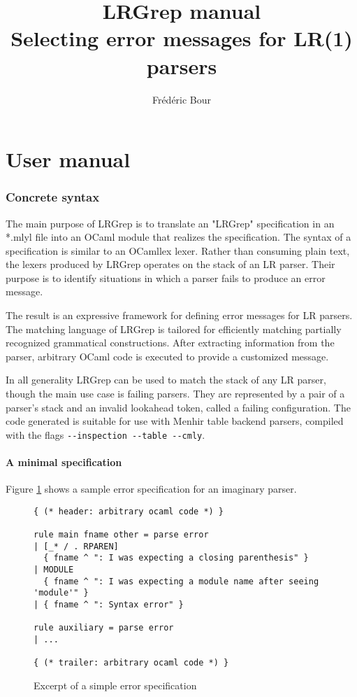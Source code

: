 \documentclass{article}
\title{LRGrep manual \\
  Selecting error messages for LR(1) parsers}
\author{Frédéric Bour}
\newcommand{\gloss}[1]{#1}
\begin{document}
\maketitle

\part{User manual}

\section{Concrete syntax}

The main purpose of LRGrep is to translate an "LRGrep" specification in an *.mlyl file into an OCaml module that realizes the specification. The syntax of a specification is similar to an OCamllex lexer. Rather than consuming plain text, the lexers produced by LRGrep operates on the stack of an LR parser. Their purpose is to identify situations in which a parser fails to produce an error message.

The result is an expressive framework for defining error messages for LR parsers. The matching language of LRGrep is tailored for efficiently matching partially recognized grammatical constructions. After extracting information from the parser, arbitrary OCaml code is executed to provide a customized message. 

In all generality LRGrep can be used to match the stack of any LR parser, though the main use case is failing parsers. They are represented by a pair of a parser's stack and an invalid lookahead token, called a \gloss{failing configuration}. The code generated is suitable for use with Menhir table backend parsers, compiled with the flags \verb|--inspection --table --cmly|.

\subsection{A minimal specification}

Figure \ref{spec-1} shows a sample error specification for an imaginary parser.

\begin{figure}[h]
\begin{verbatim}
{ (* header: arbitrary ocaml code *) }

rule main fname other = parse error
| [_* / . RPAREN] 
  { fname ^ ": I was expecting a closing parenthesis" }
| MODULE
  { fname ^ ": I was expecting a module name after seeing 'module'" }
| { fname ^ ": Syntax error" }

rule auxiliary = parse error
| ...

{ (* trailer: arbitrary ocaml code *) }
\end{verbatim}
\label{spec-1}
\caption{Excerpt of a simple error specification}
\end{figure}
\end{document}
